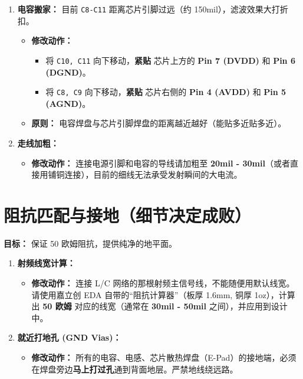 \documentclass[a4paper,12pt]{article}
\begin{document}
	\begin{enumerate}
		\item \textbf{电容搬家：} 目前 \texttt{C8-C11} 距离芯片引脚过远（约 150mil），滤波效果大打折扣。
		\begin{itemize}
			\item \textbf{修改动作：}
			\begin{itemize}
				\item 将 \texttt{C10, C11} 向下移动，\textbf{紧贴} 芯片上方的 \textbf{Pin 7 (DVDD)} 和 \textbf{Pin 6 (DGND)}。
				\item 将 \texttt{C8, C9} 向下移动，\textbf{紧贴} 芯片右侧的 \textbf{Pin 4 (AVDD)} 和 \textbf{Pin 5 (AGND)}。
			\end{itemize}
			\item \textbf{原则：} 电容焊盘与芯片引脚焊盘的距离越近越好（能贴多近贴多近）。
		\end{itemize}
		\item \textbf{走线加粗：}
		\begin{itemize}
			\item \textbf{修改动作：} 连接电源引脚和电容的导线请加粗至 \textbf{20mil - 30mil}（或者直接用铺铜连接），目前的细线无法承受发射瞬间的大电流。
		\end{itemize}
	\end{enumerate}

	\section{阻抗匹配与接地（细节决定成败）}
	\textbf{目标：} 保证 50 欧姆阻抗，提供纯净的地平面。

	\begin{enumerate}
		\item \textbf{射频线宽计算：}
		\begin{itemize}
			\item \textbf{修改动作：} 连接 L/C 网络的那根射频主信号线，不能随便用默认线宽。请使用嘉立创 EDA 自带的“阻抗计算器”（板厚 1.6mm, 铜厚 1oz），计算出 \textbf{50 欧姆} 对应的线宽（通常在 \textbf{30mil - 50mil} 之间），并应用到设计中。
		\end{itemize}
		\item \textbf{就近打地孔 (GND Vias)：}
		\begin{itemize}
			\item \textbf{修改动作：} 所有的电容、电感、芯片散热焊盘（E-Pad）的接地端，必须在焊盘旁边\textbf{马上打过孔}通到背面地层。严禁地线绕远路。
		\end{itemize}
	\end{enumerate}
\end{document}

